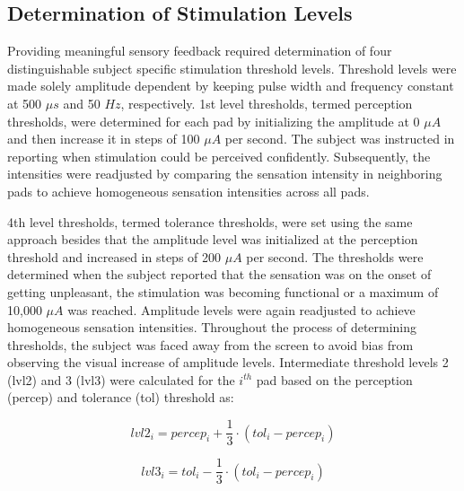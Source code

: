 
\subsection{Determination of Stimulation Levels}


Providing meaningful sensory feedback required determination of four distinguishable subject specific stimulation threshold levels. Threshold levels were made solely amplitude dependent by keeping pulse width and frequency constant at 500 $\mu s$ and 50 $Hz$, respectively.  1st level thresholds, termed perception thresholds, were determined for each pad by initializing the amplitude at 0 $\mu A$ and then increase it in steps of 100 $\mu A$ per second. The subject was instructed in reporting when stimulation could be perceived confidently. Subsequently, the intensities were readjusted by comparing the sensation intensity in neighboring pads to achieve homogeneous sensation intensities across all pads. 

4th level thresholds, termed tolerance thresholds, were set using the same approach besides that the amplitude level was initialized at the perception threshold and increased in steps of 200 $\mu A$ per second. The thresholds were determined when the subject reported that the sensation was on the onset of getting unpleasant, the stimulation was becoming functional or a maximum of 10,000 $\mu A$ was reached. Amplitude levels were again readjusted to achieve homogeneous sensation intensities. Throughout the process of determining thresholds, the subject was faced away from the screen to avoid bias from observing the visual increase of amplitude levels. Intermediate threshold levels 2 (lvl2) and 3 (lvl3) were calculated for the $i^{th}$ pad based on the perception (percep) and tolerance (tol) threshold as: 

	\begin{equation}
	lvl2_i = percep_i + \frac{1}{3} \cdot (tol_i - percep_i)
	\end{equation}

	\begin{equation}
	lvl3_i = tol_i - \frac{1}{3} \cdot (tol_i - percep_i)
	\end{equation}
